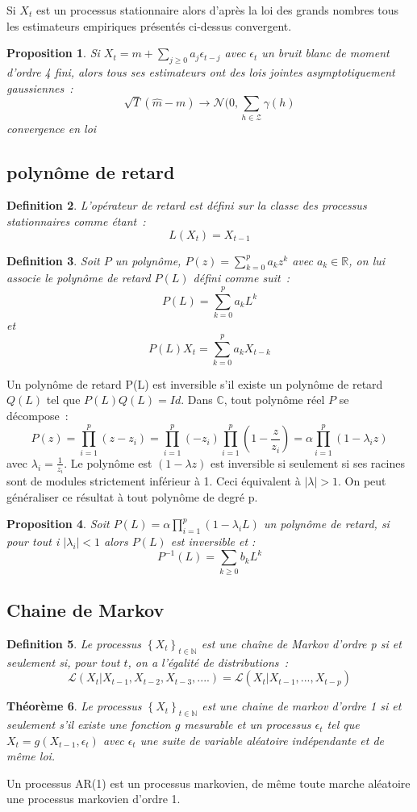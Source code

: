 \documentclass[11pt]{scrartcl} %
\newtheorem{theorem}{Théorème}[section]
\newtheorem{Def}[theorem]{Definition}
\newtheorem{pro}[theorem]{Proposition}
\begin{document}
Si $X_t$ est un processus stationnaire alors d'après la loi des grands nombres tous les estimateurs empiriques présentés ci-dessus convergent.

\begin{pro}
Si $X_t=m+\sum_{j\geq 0}a_j\epsilon_{t-j}$ avec $\epsilon_t$ un bruit blanc de moment d'ordre 4 fini, alors tous ses estimateurs ont des lois jointes asymptotiquement gaussiennes~:
$$
\sqrt{T}\left(\hat{m}-m\right)\rightarrow \mathcal{N}(0,\sum_{h\in\mathcal{Z}}\gamma(h)
$$
convergence en loi
\end{pro}
\subsection{polynôme de retard}
\begin{Def}
L'opérateur de retard est défini sur la classe des processus stationnaires comme étant~: 
$$
L(X_t)=X_{t-1}
$$
\end{Def}
\begin{Def}
Soit $P$ un polynôme, $P(z)=\sum_{k=0}^{p}a_kz^k$ avec $a_k\in\mathbb{R}$, on lui associe le polynôme de retard $P(L)$ défini comme suit~:
$$
P(L)=\sum_{k=0}^pa_kL^k
$$
et 
$$
P(L)X_t=\sum_{k=0}^pa_kX_{t-k}
$$
\end{Def}
Un polynôme de retard P(L) est inversible s'il existe un polynôme de retard $Q(L)$ tel que $P(L)Q(L)=Id$. Dans $\mathbb{C}$, tout polynôme réel $P$ se décompose~:
$$
P(z)=\prod_{i=1}^p(z-z_i)=\prod_{i=1}^p(-z_i)\prod_{i=1}^p(1-\frac{z}{z_i})=\alpha\prod_{i=1}^p(1-\lambda_i z)
$$
avec $\lambda_i=\frac{1}{z_i}$.
Le polynôme est $(1-\lambda z)$ est inversible si seulement si ses racines sont de modules strictement inférieur à 1. Ceci équivalent à $|\lambda|>1$. On peut généraliser ce résultat à tout polynôme de degré p.
\begin{pro}
Soit $P(L) = \alpha\prod_{i=1}^p(1-\lambda_i L)$ un polynôme de retard, si pour tout i $|\lambda_i|<1$ alors $P(L)$ est inversible et :
$$
P^{-1}(L)= \sum_{k\geq 0}b_kL^k
$$
\end{pro}

\subsection{Chaine de Markov}
\begin{Def}
Le processus $\left\{X_t\right\}_{t\in\mathbb{N}}$ est une chaîne de Markov d'ordre p si et seulement si, pour tout $t$, on a l'égalité de distributions~:
$$
\mathcal{L}\left(X_t|X_{t-1},X_{t-2},X_{t-3},....\right) = \mathcal{L}\left(X_t|X_{t-1},...,X_{t-p}\right)
$$
\end{Def}
\begin{theorem}
Le processus $\left\{X_t\right\}_{t\in\mathbb{N}}$ est une chaine de markov d'ordre 1 si et seulement s'il existe une fonction $g$ mesurable et un processus $\epsilon_t$ tel que $X_t=g(X_{t-1},\epsilon_t)$ avec $\epsilon_t$ une suite de variable aléatoire indépendante et de même loi.
\end{theorem}
Un processus AR(1) est un processus markovien, de même toute marche aléatoire une processus markovien d'ordre 1.
\end{document}
